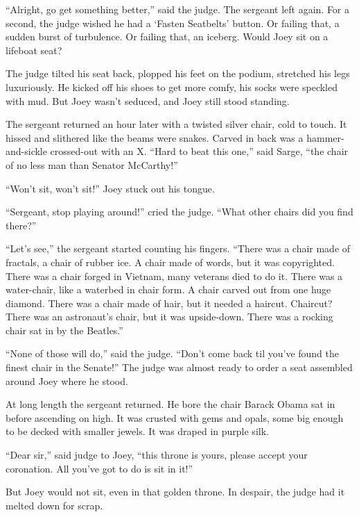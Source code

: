 \documentclass[oneside]{book}
\begin{document}
``Alright, go get something better,'' said the judge.  The sergeant left again.
For a second, the judge wished he had a `Fasten Seatbelts' button.
Or failing that, a sudden burst of turbulence.
Or failing that, an iceberg.  Would Joey sit on a lifeboat seat?

The judge tilted his seat back, plopped his feet on the podium, stretched
his legs luxuriously.
He kicked off his shoes to get more comfy, his socks were speckled with mud.
But Joey wasn't seduced, and Joey still stood standing.

The sergeant returned an hour later with a twisted silver chair, cold
to touch.  It hissed and slithered
like the beams were snakes.  Carved in back was a
hammer-and-sickle crossed-out with an X.  ``Hard to beat this one,'' said Sarge,
``the chair of no less man than Senator McCarthy!''

``Won't sit, won't sit!'' Joey stuck out his tongue.

``Sergeant, stop playing around!'' cried the judge.
``What other chairs did you find there?''

``Let's see,'' the sergeant started counting his fingers.
``There was a chair made of fractals, a chair of rubber ice.  A chair made of words,
but it was copyrighted.  There was a chair forged in Vietnam, many veterans died
to do it.  There was a water-chair, like a waterbed in chair form.
A chair carved out from one huge diamond.
There was a chair made of hair, but it needed a haircut.
Chaircut?
There was an astronaut's chair, but it was upside-down.
There was a rocking chair sat in by the Beatles.''

``None of those will do,'' said the judge.  ``Don't come back til you've
found the finest chair in the Senate!''  The judge was almost ready to
order a seat assembled around Joey where he stood.

At long length the sergeant returned.  He bore the chair Barack Obama
sat in before ascending on high.  It was crusted with gems and opals, some
big enough to be decked with smaller jewels.  It was draped in purple silk.

``Dear sir,'' said judge to Joey, ``this throne is yours, please accept your
coronation.  All you've got to do is sit in it!''

But Joey would not sit, even in that golden throne.
In despair, the judge had it melted down for scrap.
\end{document}
